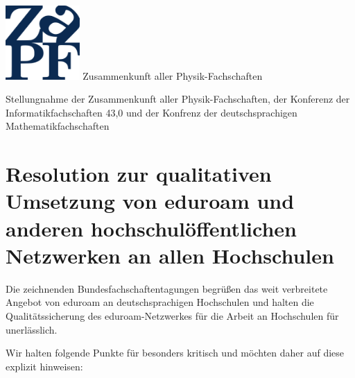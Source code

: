 \documentclass[DIV=calc]{scrartcl}
\begin{document}
\hspace{0.87\textwidth}
\begin{minipage}{120pt}
\vspace{-1.8cm}
\includegraphics[width=80pt]{../../logo.pdf}
\centering
\small Zusammenkunft aller Physik-Fachschaften
\end{minipage}
\begin{center}
\huge{Stellungnahme der Zusammenkunft aller Physik-Fachschaften, der Konferenz
der Informatikfachschaften 43,0 und der Konfrenz der deutschsprachigen Mathematikfachschaften} \\
\normalsize
\end{center}

\vspace{0.4cm}
\section*{Resolution zur qualitativen Umsetzung von  eduroam und anderen
  hochschulöffentlichen Netzwerken an allen Hochschulen}

  Die zeichnenden Bundesfachschaftentagungen begrüßen das weit verbreitete
  Angebot von eduroam an deutschsprachigen Hochschulen und halten die
  Qualitätssicherung des eduroam-Netzwerkes für die Arbeit an Hochschulen für
  unerlässlich.

  Wir halten folgende Punkte für besonders kritisch und möchten daher auf diese
  explizit hinweisen:
\end{document}
